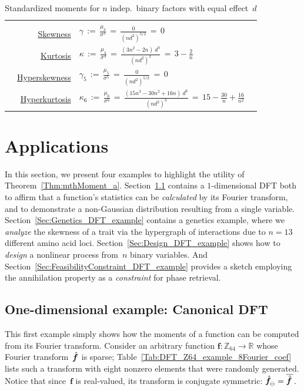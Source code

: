 \documentclass[letterpaper,11pt]{article}
\newcommand{\bs}[1]{{\boldsymbol{#1}}}
\newcommand{\gr}[1]{( #1 )}
\newcommand{\Real}{\mathbb R}
\newcommand{\Int}{\mathbb Z}
\newcommand{\hatbsf}{{\kern+0.25em}\hat{{\kern-0.25em}\bs{f}}}
\theoremstyle{definition} \newtheorem{remark}{Remark}
\begin{document}
\begin{table}[!htb]
\centering
\caption{Standardized moments for $n$ indep.~binary factors with equal effect~$d$} \label{Tab:StandMoments BinomDist}
  \vspace{3pt}
  \begin{tabular}{|crlc|}
  \hline
  & & & \\[-10pt]
  & \underline{Skewness}      & $\displaystyle \gamma \,:=\, \frac{\mu_3}{\sigma^3} \,=\, \frac{0}{\gr{nd^2}^{3/2}} \,=\, 0$ & \\[12pt]
  & \underline{Kurtosis}      & $\displaystyle \kappa \,:=\, \frac{\mu_4}{\sigma^4} \,=\, \frac{\gr{3n^2-2n} \:\! d^4}{\gr{nd^2}^{2}} \,=\, 3 - \frac{2}{n}$ & \\[12pt]
  & \underline{Hyperskewness} & $\displaystyle \gamma_5 \,:=\, \frac{\mu_5}{\sigma^5} \,=\, \frac{0}{\gr{nd^2}^{5/2}} \,=\, 0$ & \\[12pt]
  & \underline{Hyperkurtosis} & $\displaystyle \kappa_6 \,:=\, \frac{\mu_6}{\sigma^6} \,=\, \frac{\gr{15n^3-30n^2+16n} \:\! d^6}{\gr{nd^2}^{3}} \,=\, 15 - \frac{30}{n} + \frac{16}{n^2}$ & \\[12pt]
\hline
\end{tabular}
\end{table}


\section{Applications} \label{Sec:Applications}
In this section, we present four examples to highlight the utility of Theorem~\ref{Thm:mthMoment_a}. Section~\ref{Sec:1D_DFT_example} contains a $1$-dimensional DFT both to affirm that a function's statistics can be \emph{calculated} by its Fourier transform, and to demonstrate a non-Gaussian distribution resulting from a single variable. Section~\ref{Sec:Genetics_DFT_example} contains a genetics example, where we \emph{analyze} the skewness of a trait via the hypergraph of interactions due to $n=13$ different amino acid loci. Section~\ref{Sec:Design_DFT_example} shows how to \emph{design} a nonlinear process from~$n$ binary variables. And Section~\ref{Sec:FeasibilityConstraint_DFT_example} provides a sketch employing the annihilation property as a \emph{constraint} for phase retrieval.


\subsection{One-dimensional example: Canonical DFT} \label{Sec:1D_DFT_example}
This first example simply shows how the moments of a function can be computed from its Fourier transform. Consider an arbitrary function $\bs{f}:\Int_{64}\rightarrow\Real$ whose Fourier transform~$\hatbsf$ is sparse; Table~\ref{Tab:DFT_Z64_example_8Fourier_coef} lists such a transform with eight nonzero elements that were randomly generated. Notice that since~$\bs{f}$ is real-valued, its transform is conjugate symmetric: ${\hatbsf}_{\!\ominus} = \overline{\hatbsf\,}$.
\end{document}

